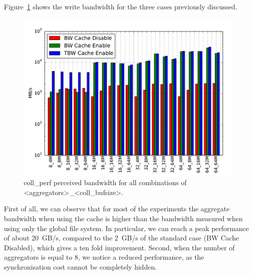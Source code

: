 Figure~\ref{figure: collperf-bw} shows the write bandwidth for the three cases previously discussed.
\begin{figure}[b!]
  \centering
  \includegraphics[width=0.95\columnwidth]{figures/coll_perf_32GB_30sec_bw}
  \caption{coll\_perf perceived bandwidth for all combinations of <aggregators>\_<coll\_bufsize>.} %
  \label{figure: collperf-bw}
\end{figure}
First of all, we can observe that for most of the experiments the aggregate bandwidth when using the cache is higher than the bandwidth measured when using only the global file system. In particular, we can reach a peak performance of about 20~GB/s, compared to the 2~GB/s of the standard case (BW Cache Disabled), which gives a ten fold improvement. Second, when the number of aggregators is equal to 8, we notice a reduced performance, as the synchronisation cost cannot be completely hidden.

